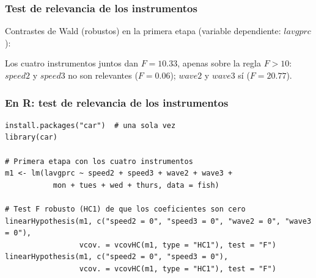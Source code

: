 \documentclass[t, compress, spanish, aspectratio=169]{beamer}
\begin{document}
\begin{frame}
	\frametitle{Test de relevancia de los instrumentos}
	Contrastes de Wald (robustos) en la primera etapa (variable dependiente: $lavgprc$):
	\begin{center}
	\small
	
	\end{center}
	\small
	Los cuatro instrumentos juntos dan $F=10.33$, apenas sobre la regla $F>10$: $speed2$ y $speed3$ no son relevantes ($F=0.06$); $wave2$ y $wave3$ s\'i ($F=20.77$).
\end{frame}
\begin{frame}[fragile]
	\frametitle{En R: test de relevancia de los instrumentos}
\footnotesize
\begin{verbatim}
install.packages("car")  # una sola vez
library(car)

# Primera etapa con los cuatro instrumentos
m1 <- lm(lavgprc ~ speed2 + speed3 + wave2 + wave3 +
           mon + tues + wed + thurs, data = fish)

# Test F robusto (HC1) de que los coeficientes son cero
linearHypothesis(m1, c("speed2 = 0", "speed3 = 0", "wave2 = 0", "wave3 = 0"),
                 vcov. = vcovHC(m1, type = "HC1"), test = "F")
linearHypothesis(m1, c("speed2 = 0", "speed3 = 0"),
                 vcov. = vcovHC(m1, type = "HC1"), test = "F")
\end{verbatim}
\end{frame}
\end{document}
